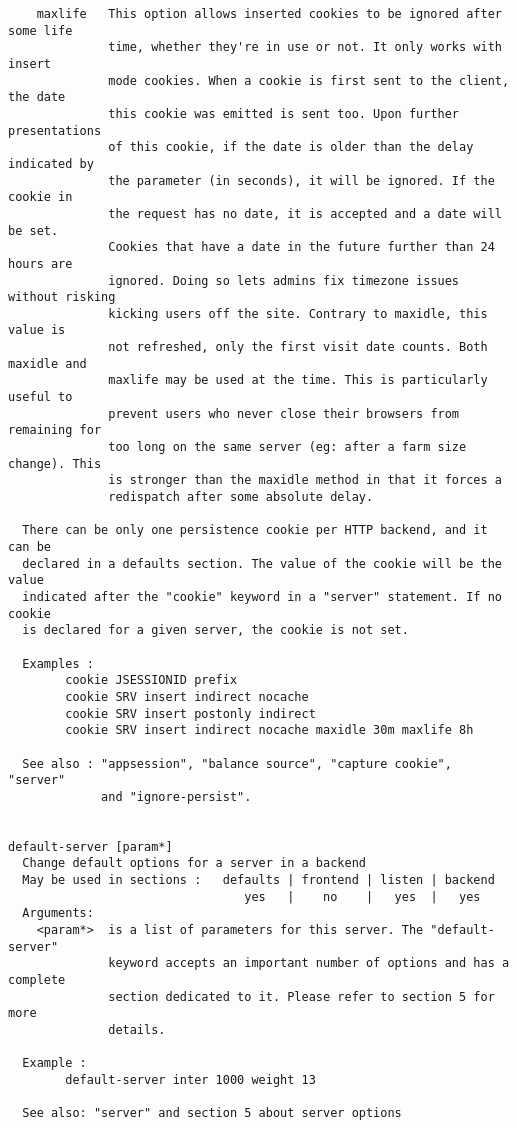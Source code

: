 \begin{verbatim}
    maxlife   This option allows inserted cookies to be ignored after some life
              time, whether they're in use or not. It only works with insert
              mode cookies. When a cookie is first sent to the client, the date
              this cookie was emitted is sent too. Upon further presentations
              of this cookie, if the date is older than the delay indicated by
              the parameter (in seconds), it will be ignored. If the cookie in
              the request has no date, it is accepted and a date will be set.
              Cookies that have a date in the future further than 24 hours are
              ignored. Doing so lets admins fix timezone issues without risking
              kicking users off the site. Contrary to maxidle, this value is
              not refreshed, only the first visit date counts. Both maxidle and
              maxlife may be used at the time. This is particularly useful to
              prevent users who never close their browsers from remaining for
              too long on the same server (eg: after a farm size change). This
              is stronger than the maxidle method in that it forces a
              redispatch after some absolute delay.

  There can be only one persistence cookie per HTTP backend, and it can be
  declared in a defaults section. The value of the cookie will be the value
  indicated after the "cookie" keyword in a "server" statement. If no cookie
  is declared for a given server, the cookie is not set.

  Examples :
        cookie JSESSIONID prefix
        cookie SRV insert indirect nocache
        cookie SRV insert postonly indirect
        cookie SRV insert indirect nocache maxidle 30m maxlife 8h

  See also : "appsession", "balance source", "capture cookie", "server"
             and "ignore-persist".


default-server [param*]
  Change default options for a server in a backend
  May be used in sections :   defaults | frontend | listen | backend
                                 yes   |    no    |   yes  |   yes
  Arguments:
    <param*>  is a list of parameters for this server. The "default-server"
              keyword accepts an important number of options and has a complete
              section dedicated to it. Please refer to section 5 for more
              details.

  Example :
        default-server inter 1000 weight 13

  See also: "server" and section 5 about server options



\end{verbatim}
